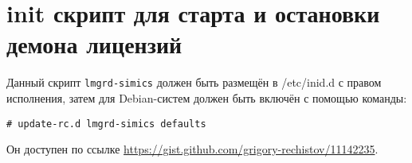% 
% 
% 
% 


\section{init скрипт для старта и остановки демона лицензий}
Данный скрипт \texttt{lmgrd-simics} должен быть размещён в /etc/inid.d с правом исполнения, затем для Debian-систем должен быть включён с помощью команды:

\texttt{\# update-rc.d lmgrd-simics defaults}

Он доступен по ссылке \url{https://gist.github.com/grigory-rechistov/11142235}.

